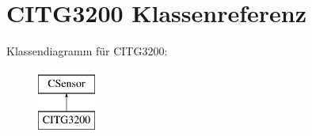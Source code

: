 \hypertarget{class_c_i_t_g3200}{\section{\-C\-I\-T\-G3200 \-Klassenreferenz}
\label{class_c_i_t_g3200}
}
\-Klassendiagramm für \-C\-I\-T\-G3200\-:\begin{figure}[H]
\begin{center}
\leavevmode
\includegraphics[height=2.000000cm]{class_c_i_t_g3200}
\end{center}
\end{figure}
